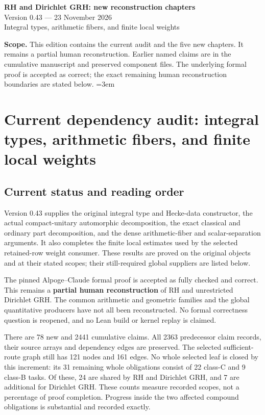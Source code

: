 \documentclass[11pt,a4paper]{article}
\numberwithin{equation}{section}
\theoremstyle{remark}\newtheorem{remark}[theorem]{Remark}
\begin{document}
\begin{center}
{\LARGE\bfseries RH and Dirichlet GRH: new reconstruction chapters}\\[7pt]
{\large Version 0.43 --- 23 November 2026}\\[5pt]
{\large Integral types, arithmetic fibers, and finite local weights}
\end{center}
\textbf{Scope.} This edition contains the current audit and the five new
chapters. It remains a partial human reconstruction. Earlier named
claims are in the cumulative manuscript and preserved component files.
The underlying formal proof is accepted as correct; the exact remaining
human reconstruction boundaries are stated below.
\setcounter{tocdepth}{1}
\tableofcontents
\clearpage
\begingroup\emergencystretch=3em
\section{Current dependency audit: integral types, arithmetic fibers, and finite local weights}
\label{sec:dependency-audit-v43}

\subsection{Current status and reading order}

Version 0.43 supplies the original integral type and Hecke-data
constructor, the actual compact-unitary automorphic decomposition,
the exact classical and ordinary part decomposition, and the dense
arithmetic-fiber and scalar-separation arguments. It also completes
the finite local estimates used by the selected retained-row weight
consumer. These results are proved on the original objects and at
their stated scopes; their still-required global suppliers are listed
below.

The pinned Alpoge--Claude formal proof is accepted as fully checked
and correct. This remains a \textbf{partial human reconstruction} of
RH and unrestricted Dirichlet GRH. The common arithmetic and geometric
families and the global quantitative producers have not all been
reconstructed. No formal correctness question is reopened, and no
Lean build or kernel replay is claimed.

There are 78 new and 2441 cumulative claims. All 2363 predecessor
claim records, their source arrays and dependency edges are preserved.
The selected sufficient-route graph still has 121 nodes and 161 edges.
No whole selected leaf is closed by this increment: its 31 remaining
whole obligations consist of 22 class-C and 9 class-B tasks. Of these,
24 are shared by RH and Dirichlet GRH, and 7 are additional for Dirichlet
GRH. These counts measure recorded scopes, not a percentage of proof
completion. Progress inside the two affected compound obligations is
substantial and recorded exactly.
\end{document}
